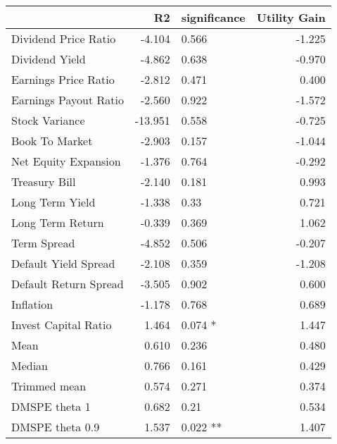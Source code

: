 \begin{tabular}{lrlr}
\toprule
{} &      R2 & significance &  Utility Gain \\
\midrule
Dividend Price Ratio  &  -4.104 &       0.566  &        -1.225 \\
Dividend Yield        &  -4.862 &       0.638  &        -0.970 \\
Earnings Price Ratio  &  -2.812 &       0.471  &         0.400 \\
Earnings Payout Ratio &  -2.560 &       0.922  &        -1.572 \\
Stock Variance        & -13.951 &       0.558  &        -0.725 \\
Book To Market        &  -2.903 &       0.157  &        -1.044 \\
Net Equity Expansion  &  -1.376 &       0.764  &        -0.292 \\
Treasury Bill         &  -2.140 &       0.181  &         0.993 \\
Long Term Yield       &  -1.338 &        0.33  &         0.721 \\
Long Term Return      &  -0.339 &       0.369  &         1.062 \\
Term Spread           &  -4.852 &       0.506  &        -0.207 \\
Default Yield Spread  &  -2.108 &       0.359  &        -1.208 \\
Default Return Spread &  -3.505 &       0.902  &         0.600 \\
Inflation             &  -1.178 &       0.768  &         0.689 \\
Invest Capital Ratio  &   1.464 &      0.074 * &         1.447 \\
Mean                  &   0.610 &       0.236  &         0.480 \\
Median                &   0.766 &       0.161  &         0.429 \\
Trimmed mean          &   0.574 &       0.271  &         0.374 \\
DMSPE theta 1         &   0.682 &        0.21  &         0.534 \\
DMSPE theta 0.9       &   1.537 &     0.022 ** &         1.407 \\
\bottomrule
\end{tabular}
